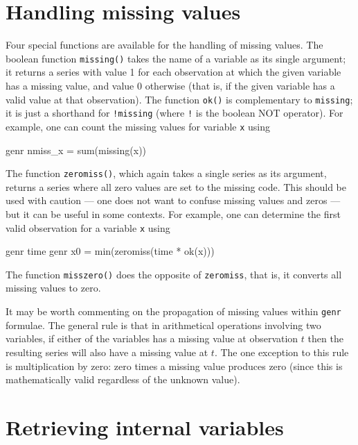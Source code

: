 \section{Handling missing values}
\label{sec:genr-missing}

Four special functions are available for the handling of missing
values.  The boolean function \verb+missing()+ takes the name of a
variable as its single argument; it returns a series with value 1 for
each observation at which the given variable has a missing value, and
value 0 otherwise (that is, if the given variable has a valid value at
that observation).  The function \verb+ok()+ is complementary to
\verb+missing+; it is just a shorthand for \verb+!missing+ (where
\verb+!+ is the boolean NOT operator).  For example, one can count the
missing values for variable \verb+x+ using

\begin{code}
genr nmiss_x = sum(missing(x))
\end{code}

The function \verb+zeromiss()+, which again takes a single series as
its argument, returns a series where all zero values are set to the
missing code.  This should be used with caution --- one does not want
to confuse missing values and zeros --- but it can be useful in some
contexts.  For example, one can determine the first valid observation
for a variable \verb+x+ using

\begin{code}
genr time
genr x0 = min(zeromiss(time * ok(x)))
\end{code}

The function \verb+misszero()+ does the opposite of \verb+zeromiss+,
that is, it converts all missing values to zero.  

It may be worth commenting on the propagation of missing values within
\verb+genr+ formulae.  The general rule is that in arithmetical
operations involving two variables, if either of the variables has a
missing value at observation $t$ then the resulting series will also
have a missing value at $t$.  The one exception to this rule is
multiplication by zero: zero times a missing value produces zero
(since this is mathematically valid regardless of the unknown value).
    

\section{Retrieving internal variables}
\label{sec:genr-internal}

